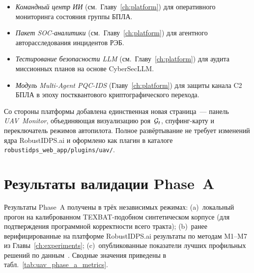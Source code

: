 \begin{itemize}\setlength\itemsep{0.1em}
\item \emph{Командный центр ИИ} (см.\ Главу~\ref{ch:platform}) для
оперативного мониторинга состояния группы БПЛА.
\item \emph{Пакет SOC-аналитики} (см.\ Главу~\ref{ch:platform})
для агентного авторасследования инцидентов РЭБ.
\item \emph{Тестирование безопасности LLM} (см.\ Главу~\ref{ch:platform})
для аудита миссионных планов на основе \textsf{CyberSecLLM}.
\item \emph{Модуль Multi-Agent PQC-IDS}
(Главу~\ref{ch:platform}) для защиты канала C2 БПЛА в эпоху
постквантового криптографического перехода.
\end{itemize}

Со стороны платформы добавлена единственная новая страница~--- панель
\emph{UAV~Monitor}, объединяющая визуализацию роя~$\mathcal{G}_t$, спуфинг-карту
и переключатель режимов автопилота. Полное развёртывание не требует
изменений ядра \textsf{RobustIDPS.ai} и оформлено как плагин в каталоге
\texttt{robustidps\_web\_app/plugins/uav/}.


\section{Результаты валидации Phase~A}
\label{sec:uav_phase_a_results}

Результаты Phase~A получены в трёх независимых режимах: (a)~локальный
прогон на калиброванном TEXBAT-подобном синтетическом корпусе (для
подтверждения программной корректности всего тракта); (b)~ранее
верифицированные на платформе \textsf{RobustIDPS.ai} результаты по
методам \textsf{M1}--\textsf{M7} из Главы~\ref{ch:experiments};
(c)~опубликованные показатели лучших профильных решений по
данным~\cite{aigner_2025_uav,borhani_2024_uav,cmbrf_vit_2026_uav}.
Сводные значения приведены в табл.~\ref{tab:uav_phase_a_metrics}.

